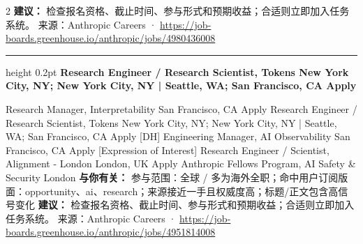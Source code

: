 \documentclass[10.5pt]{ctexart}
\begin{document}
\begin{multicols}{2}
\textbf{建议：} 检查报名资格、截止时间、参与形式和预期收益；合适则立即加入任务系统。
{\footnotesize\color{ormuted} 来源：Anthropic Careers · \url{https://job-boards.greenhouse.io/anthropic/jobs/4980436008}}
\vspace{2mm}
\hrule height 0.2pt
\vspace{2mm}
{\large\bfseries Research Engineer / Research Scientist, Tokens New York City, NY; New York City, NY | Seattle, WA; San Francisco, CA Apply}\par
[Expression of Interest] Research Manager, Interpretability San Francisco, CA Apply Research Engineer / Research Scientist, Tokens New York City, NY; New York City, NY | Seattle, WA; San Francisco, CA Apply [DH] Engineering Manager, AI Observability San Francisco, CA Apply [Expression of Interest] Research Engineer / Scientist, Alignment - London London, UK Apply Anthropic Fellows Program, AI Safety \& Security London
\textbf{与你有关：} 参与范围：全球 / 多为海外全职；命中用户订阅版面：opportunity、ai、research；来源接近一手且权威度高；标题/正文包含高信号变化
\textbf{建议：} 检查报名资格、截止时间、参与形式和预期收益；合适则立即加入任务系统。
{\footnotesize\color{ormuted} 来源：Anthropic Careers · \url{https://job-boards.greenhouse.io/anthropic/jobs/4951814008}}
\end{multicols}
\end{document}
